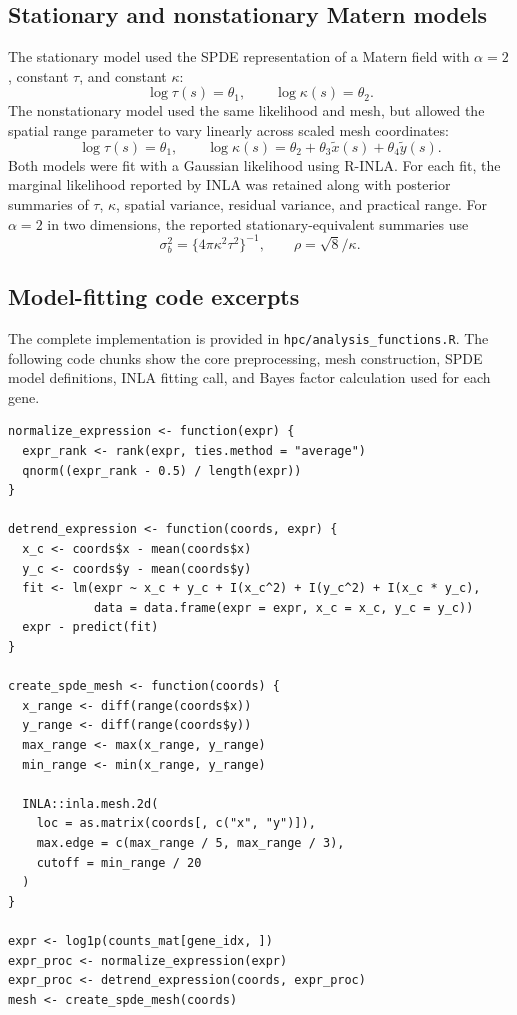 \subsection{Stationary and nonstationary Matern models}
The stationary model used the SPDE representation of a Matern field with \(\alpha = 2\), constant \(\tau\), and constant \(\kappa\):
\[
\log \tau(s) = \theta_1, \qquad \log \kappa(s) = \theta_2.
\]
The nonstationary model used the same likelihood and mesh, but allowed the spatial range parameter to vary linearly across scaled mesh coordinates:
\[
\log \tau(s) = \theta_1, \qquad
\log \kappa(s) = \theta_2 + \theta_3 \tilde{x}(s) + \theta_4 \tilde{y}(s).
\]
Both models were fit with a Gaussian likelihood using R-INLA. For each fit, the marginal likelihood reported by INLA was retained along with posterior summaries of \(\tau\), \(\kappa\), spatial variance, residual variance, and practical range. For \(\alpha=2\) in two dimensions, the reported stationary-equivalent summaries use
\[
\sigma_b^2 = \{4\pi \kappa^2\tau^2\}^{-1}, \qquad
\rho = \sqrt{8}/\kappa .
\]

\subsection{Model-fitting code excerpts}
The complete implementation is provided in \texttt{hpc/analysis\_functions.R}. The following code chunks show the core preprocessing, mesh construction, SPDE model definitions, INLA fitting call, and Bayes factor calculation used for each gene.

\begin{lstlisting}[style=rcode,caption={Preprocessing and shared SPDE mesh construction.}]
normalize_expression <- function(expr) {
  expr_rank <- rank(expr, ties.method = "average")
  qnorm((expr_rank - 0.5) / length(expr))
}

detrend_expression <- function(coords, expr) {
  x_c <- coords$x - mean(coords$x)
  y_c <- coords$y - mean(coords$y)
  fit <- lm(expr ~ x_c + y_c + I(x_c^2) + I(y_c^2) + I(x_c * y_c),
            data = data.frame(expr = expr, x_c = x_c, y_c = y_c))
  expr - predict(fit)
}

create_spde_mesh <- function(coords) {
  x_range <- diff(range(coords$x))
  y_range <- diff(range(coords$y))
  max_range <- max(x_range, y_range)
  min_range <- min(x_range, y_range)

  INLA::inla.mesh.2d(
    loc = as.matrix(coords[, c("x", "y")]),
    max.edge = c(max_range / 5, max_range / 3),
    cutoff = min_range / 20
  )
}

expr <- log1p(counts_mat[gene_idx, ])
expr_proc <- normalize_expression(expr)
expr_proc <- detrend_expression(coords, expr_proc)
mesh <- create_spde_mesh(coords)
\end{lstlisting}


